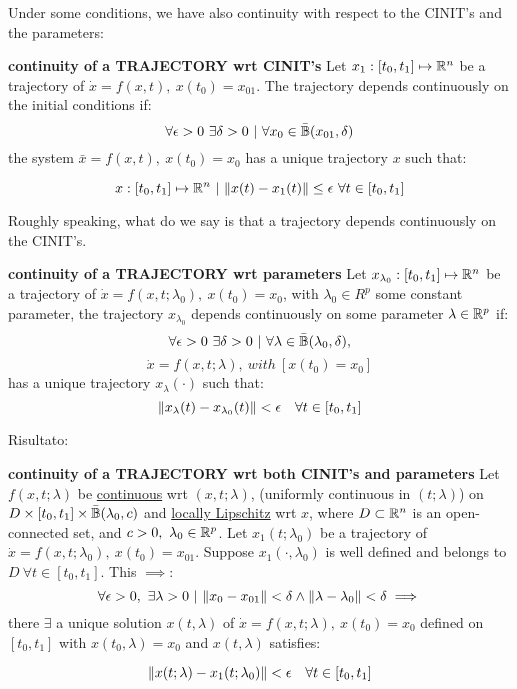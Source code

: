 Under some conditions, we have also continuity with respect to the CINIT's and the parameters:

\begin{defn}{\textbf{continuity of a TRAJECTORY wrt CINIT's}}
Let $x_1:[t_0,t_1] \mapsto \mathbb{R}^n$ be a trajectory of $\dot{x}=f(x,t),\ x(t_0) = x_{01}$. The trajectory depends continuously on the initial conditions if:
\[
	\forall \epsilon > 0\ \exists \delta > 0\ |\ \forall x_0 \in \cball(x_{01},\delta)
\]
the system $\bar{x}=f(x,t),\ x(t_0) = x_0$ has a unique trajectory $x$ such that:

\[
	x:[t_0,t_1] \mapsto \R^n\ |\ \norma{x(t)-x_1(t)} \leq \epsilon\ \forall t \in [t_0,t_1]
\]
\end{defn}

Roughly speaking, what do we say is that a trajectory depends continuously on the CINIT's.

\begin{defn}{\textbf{continuity of a TRAJECTORY wrt parameters}}
Let $x_{\lambda_0}:[t_0,t_1] \mapsto \mathbb{R}^n$ be a trajectory of $\dot{x} = f(x,t;\lambda_0),\ x(t_0) = x_0$, with $\lambda_0 \in R^p$ some constant parameter, the trajectory $x_{\lambda_0}$ depends continuously on some parameter $\lambda \in \mathbb{R}^p$ if:
\[
	\forall \epsilon > 0\ \exists \delta > 0\ |\ \forall \lambda \in \cball(\lambda_0,\delta),
\]
\[
	\dot{x}=f(x,t;\lambda),\ with\ [x(t_0) = x_0]
\]
has a unique trajectory $x_\lambda(\mathord{\cdot})$ such that:
\[
	\lVert x_\lambda(t) - x_{\lambda_0}(t)\rVert < \epsilon \quad \forall t \in [t_0,t_1]
\]
\end{defn}

Risultato:

\begin{thrm}{\textbf{continuity of a TRAJECTORY wrt both CINIT's and parameters}}
Let $f(x,t;\lambda)$ be \underline{continuous} wrt $(x,t;\lambda)$, (uniformly continuous in $(t;\lambda)$) on $D \times [t_0,t_1] \times \bar{\mathbb{B}}(\lambda_0,c)$ and \underline{locally Lipschitz} wrt $x$, where $D \subset \mathbb{R}^n$ is an open-connected set, and $c > 0,\ \lambda_0 \in \mathbb{R}^p$.
Let $x_1(t;\lambda_0)$ be a trajectory of $\dot{x}=f(x,t;\lambda_0),\ x(t_0) = x_{01}$. Suppose $x_1(\mathord{\cdot},\lambda_0)$ is well defined and belongs to $D \ \forall t \in [t_0,t_1]$. This $\implies$:
\[
	\forall \epsilon > 0,\ \exists \lambda > 0\ |\ \lVert x_0-x_{01}\rVert < \delta \land \lVert\lambda-\lambda_0\rVert < \delta \implies
\]
there $\exists$ a unique solution $x(t,\lambda)$ of $\dot{x}=f(x,t;\lambda),\ x(t_0) = x_0$ defined on $[t_0,t_1]$ with $x(t_0,\lambda) = x_0$ and $x(t,\lambda)$ satisfies:

\[
	\lVert x(t;\lambda) - x_1(t;\lambda_0)\rVert < \epsilon \quad \forall t \in [t_0,t_1]
\]
\end{thrm}

